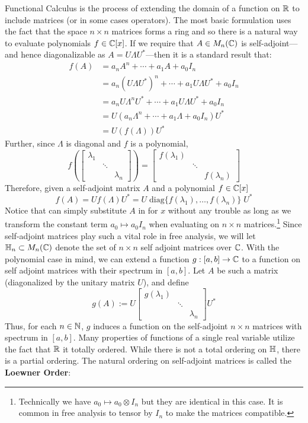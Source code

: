 Functional Calculus is the process of extending the domain of a function
on \(\mathbb{R}\) to include matrices (or in some cases operators). The most basic
formulation uses the fact that the space \(n \times n\) matrices forms a ring
and so there is a natural way to evaluate polynomials \(f \in \mathbb{C} [x]\). If we
require that $A \in M_n(\mathbb{C})$ is self-adjoint---and hence diagonalizable as
$A = U \Lambda U^*$---then it is a standard result that:
\begin{align*}
  f(A) &= a_nA^n + \cdots + a_1A + a_0 I_n \\
  &= a_n \left( U\Lambda U^* \right) ^n + \cdots + a_1 U\Lambda U^* + a_0 I_n \\
  &= a_n U\Lambda^n U^* + \cdots + a_1 U\Lambda U^* + a_0 I_n \\
  &= U \left( a_n\Lambda ^n + \cdots + a_1\Lambda + a_0 I_n \right) U^* \\
  &= U \left( f(\Lambda) \right) U^*
\end{align*}
Further, since \(\Lambda\) is diagonal and $f$ is a polynomial,
\[
  f \left( \begin{bmatrix} \lambda_1 &  &  \\  & \ddots &  \\  &  & \lambda_n \end{bmatrix}  \right)
  = \begin{bmatrix} f(\lambda_1) &  &  \\  & \ddots &  \\  &  & f(\lambda_n) \end{bmatrix}
\]
Therefore, given a self-adjoint matrix \(A\) and a polynomial \(f \in \mathbb{C} [x]\)
\[
  f(A) = Uf(\Lambda)U^* = U \;\text{diag}\{f(\lambda_{1}), \dots , f(\lambda_n)\} \; U^*
\]
Notice that can simply substitute \(A\) in for \(x\) without any trouble as long
as we transform the constant term \(a_0 \mapsto a_0I_n\) when evaluating on
\(n\times n\) matrices.\footnote{Technically we have
  \(a_0 \mapsto a_0 \otimes I_n\) but they are identical in this case. It is common in free
  analysis to tensor by \(I_n\) to make the matrices compatible.}
Since self-adjoint matrices play such a vital role in free analysis, we will let
\(\mathbb{H}_n \subset M_n(\mathbb{C})\) denote the set of \(n \times n\) self adjoint matrices over \(\mathbb{C} \).
With the polynomial case in mind, we can extend a function \(g: [a,b] \to \mathbb{C} \)
to a function on self adjoint matrices with their
spectrum in \([a,b]\). Let \(A\) be such a matrix (diagonalized by the unitary
matrix \(U\)), and define
\[
  g(A) := U
  \begin{bmatrix} g(\lambda_1) & &\\ &\ddots& \\ & & \lambda_n \end{bmatrix}
  U^*
\]
Thus, for each \(n \in \mathbb{N} \), \(g\) induces a function on the self-adjoint
\(n \times n\) matrices with spectrum in \([a,b]\). Many properties of functions
of a single real variable utilize the fact that \(\mathbb{R} \) it totally ordered.
While there is not a total ordering on \(\mathbb{H} \), there is a partial ordering.
The natural ordering on self-adjoint matrices is called the
\textbf{Loewner Order}:

